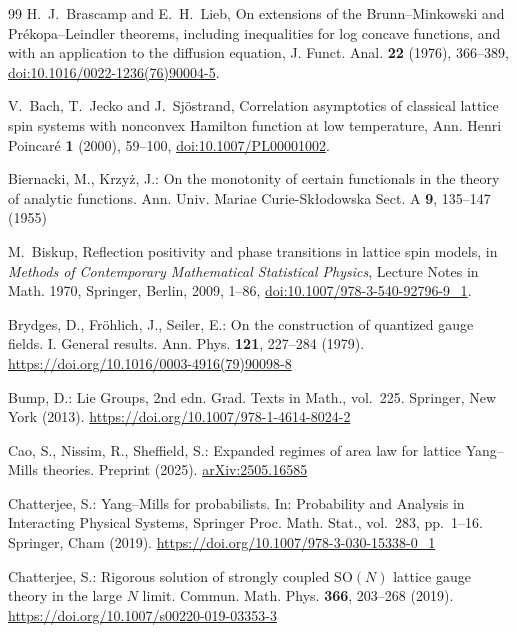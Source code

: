 \documentclass[11pt]{amsart}
\theoremstyle{definition}
\theoremstyle{remark}
\numberwithin{equation}{section}
\newcommand{\SO}{\mathrm{SO}}
\begin{document}
\begin{thebibliography}{99}
H.~J.~Brascamp and E.~H.~Lieb, On extensions of the Brunn--Minkowski and
Pr\'ekopa--Leindler theorems, including inequalities for log concave
functions, and with an application to the diffusion equation, J. Funct.
Anal. \textbf{22} (1976), 366--389,
\href{https://doi.org/10.1016/0022-1236(76)90004-5}{doi:10.1016/0022-1236(76)90004-5}.

V.~Bach, T.~Jecko and J.~Sj\"ostrand, Correlation asymptotics of classical
lattice spin systems with nonconvex Hamilton function at low temperature,
Ann. Henri Poincar\'e \textbf{1} (2000), 59--100,
\href{https://doi.org/10.1007/PL00001002}{doi:10.1007/PL00001002}.

Biernacki, M., Krzy\.z, J.: On the monotonity of certain functionals in the theory of analytic functions. Ann. Univ. Mariae Curie-Sk{\l}odowska Sect. A \textbf{9}, 135--147 (1955)

M.~Biskup, Reflection positivity and phase transitions in lattice spin
models, in \emph{Methods of Contemporary Mathematical Statistical Physics},
Lecture Notes in Math. 1970, Springer, Berlin, 2009, 1--86,
\href{https://doi.org/10.1007/978-3-540-92796-9_1}{doi:10.1007/978-3-540-92796-9\_1}.

Brydges, D., Fr\"ohlich, J., Seiler, E.: On the construction of quantized gauge fields. I. General results. Ann. Phys. \textbf{121}, 227--284 (1979). \href{https://doi.org/10.1016/0003-4916(79)90098-8}{https://doi.org/10.1016/0003-4916(79)90098-8}

Bump, D.: Lie Groups, 2nd edn. Grad. Texts in Math., vol.~225. Springer,
New York (2013).
\href{https://doi.org/10.1007/978-1-4614-8024-2}{https://doi.org/10.1007/978-1-4614-8024-2}

Cao, S., Nissim, R., Sheffield, S.: Expanded regimes of area law for lattice Yang--Mills theories. Preprint (2025). \href{https://arxiv.org/abs/2505.16585}{arXiv:2505.16585}

Chatterjee, S.: Yang--Mills for probabilists. In: Probability and Analysis in Interacting Physical Systems, Springer Proc. Math. Stat., vol.~283, pp.~1--16. Springer, Cham (2019). \href{https://doi.org/10.1007/978-3-030-15338-0_1}{https://doi.org/10.1007/978-3-030-15338-0\_1}

Chatterjee, S.: Rigorous solution of strongly coupled $\SO(N)$ lattice gauge theory in the large $N$ limit. Commun. Math. Phys. \textbf{366}, 203--268 (2019). \href{https://doi.org/10.1007/s00220-019-03353-3}{https://doi.org/10.1007/s00220-019-03353-3}


\end{thebibliography}
\end{document}
